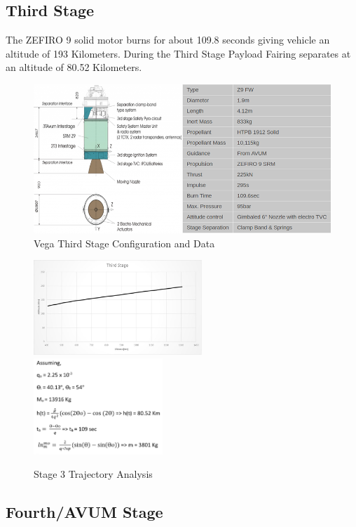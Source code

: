 \documentclass[11pt,fleqn]{book} %
\begin{document}
\subsection{Third Stage}

The ZEFIRO 9 solid motor burns for about 109.8 seconds giving vehicle an altitude of 193  Kilometers. During the Third Stage Payload Fairing separates at an altitude of 80.52 Kilometers.
\begin{figure}[h]
    \centering
    \includegraphics[width=1.0\textwidth]{Stage3.png}
    \caption{Vega Third Stage Configuration and Data}
    \label{fig:super}
\end{figure}

\begin{figure}[h]
    \includegraphics[width=0.567\textwidth]{Stage_3_Plot.jpg}
    \includegraphics[width=0.433\textwidth]{Stage3_Cal.png}
    \caption{Stage 3 Trajectory Analysis}
    \label{fig:super}
\end{figure}
\clearpage
\subsection{Fourth/AVUM Stage}
\end{document}
